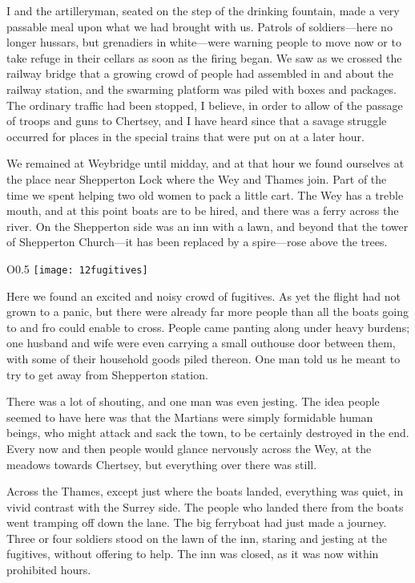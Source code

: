 I and the artilleryman, seated on the step of the drinking fountain, made a very passable meal upon what we had brought with us. Patrols of soldiers—here no longer hussars, but grenadiers in white—were warning people to move now or to take refuge in their cellars as soon as the firing began. We saw as we crossed the railway bridge that a growing crowd of people had assembled in and about the railway station, and the swarming platform was piled with boxes and packages. The ordinary traffic had been stopped, I believe, in order to allow of the passage of troops and guns to Chertsey, and I have heard since that a savage struggle occurred for places in the special trains that were put on at a later hour.

We remained at Weybridge until midday, and at that hour we found ourselves at the place near Shepperton Lock where the Wey and Thames join. Part of the time we spent helping two old women to pack a little cart. The Wey has a treble mouth, and at this point boats are to be hired, and there was a ferry across the river. On the Shepperton side was an inn with a lawn, and beyond that the tower of Shepperton Church—it has been replaced by a spire—rose above the trees.

\begin{wrapfigure}{O}{0.5\textwidth}
\centering
\texttt{[image: 12fugitives]}
\end{wrapfigure}

Here we found an excited and noisy crowd of fugitives. As yet the flight had not grown to a panic, but there were already far more people than all the boats going to and fro could enable to cross. People came panting along under heavy burdens; one husband and wife were even carrying a small outhouse door between them, with some of their household goods piled thereon. One man told us he meant to try to get away from Shepperton station.

There was a lot of shouting, and one man was even jesting. The idea people seemed to have here was that the Martians were simply formidable human beings, who might attack and sack the town, to be certainly destroyed in the end. Every now and then people would glance nervously across the Wey, at the meadows towards Chertsey, but everything over there was still.

Across the Thames, except just where the boats landed, everything was quiet, in vivid contrast with the Surrey side. The people who landed there from the boats went tramping off down the lane. The big ferryboat had just made a journey. Three or four soldiers stood on the lawn of the inn, staring and jesting at the fugitives, without offering to help. The inn was closed, as it was now within prohibited hours.

